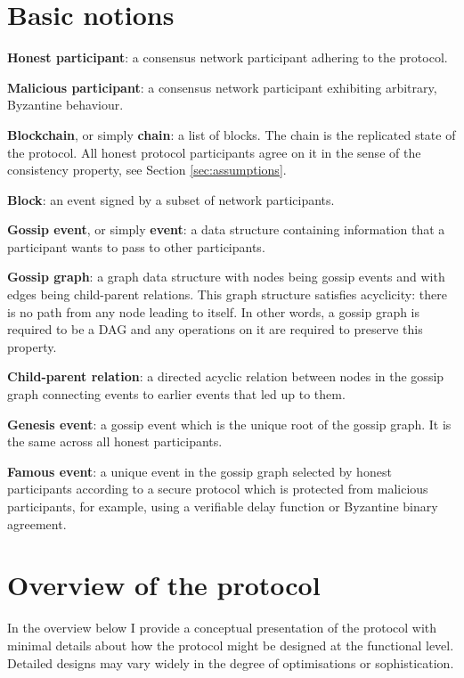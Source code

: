 \documentclass[a4paper,11pt]{article}
\begin{document}
\section{Basic notions}

\textbf{Honest participant}: a consensus network participant adhering to the protocol.

\noindent
\textbf{Malicious participant}: a consensus network participant exhibiting arbitrary, Byzantine
behaviour.

\noindent
\textbf{Blockchain}, or simply \textbf{chain}: a list of blocks. The chain is the replicated state
of the protocol. All honest protocol participants agree on it in the sense of the consistency
property, see Section \ref{sec:assumptions}.

\noindent
\textbf{Block}: an event signed by a subset of network participants.

\noindent
\textbf{Gossip event}, or simply \textbf{event}: a data structure containing information that a
participant wants to pass to other participants.

\noindent
\textbf{Gossip graph}: a graph data structure with nodes being gossip events and with edges being
child-parent relations. This graph structure satisfies acyclicity: there is no path from any node
leading to itself. In other words, a gossip graph is required to be a DAG and any operations on it
are required to preserve this property.

\noindent
\textbf{Child-parent relation}: a directed acyclic relation between nodes in the gossip graph
connecting events to earlier events that led up to them.

\noindent
\textbf{Genesis event}: a gossip event which is the unique root of the gossip graph. It is the same
across all honest participants.

\noindent
\textbf{Famous event}: a unique event in the gossip graph selected by honest participants according
to a secure protocol which is protected from malicious participants, for example, using a verifiable
delay function or Byzantine binary agreement.


\section{Overview of the protocol}

In the overview below I provide a conceptual presentation of the protocol with minimal details about
how the protocol might be designed at the functional level. Detailed designs may vary widely in the
degree of optimisations or sophistication.
\end{document}
